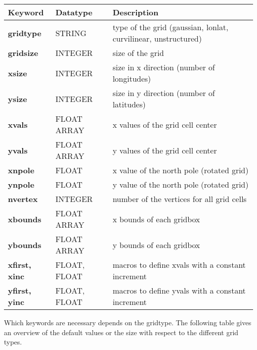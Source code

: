 \vspace{3mm}
\begin{tabular}[b]{lll}
Keyword           & Datatype     & Description \\ \hline
\bf{gridtype}     & STRING       & type of the grid (gaussian, lonlat, curvilinear, unstructured) \\
\bf{gridsize}     & INTEGER      & size of the grid \\
\bf{xsize}        & INTEGER      & size in x direction (number of longitudes) \\
\bf{ysize}        & INTEGER      & size in y direction (number of latitudes) \\
\bf{xvals}        & FLOAT ARRAY  & x values of the grid cell center \\
\bf{yvals}        & FLOAT ARRAY  & y values of the grid cell center\\
\bf{xnpole}       & FLOAT        & x value of the north pole (rotated grid) \\
\bf{ynpole}       & FLOAT        & y value of the north pole (rotated grid) \\
\bf{nvertex}      & INTEGER      & number of the vertices for all grid cells \\
\bf{xbounds}      & FLOAT ARRAY  & x bounds of each gridbox \\
\bf{ybounds}      & FLOAT ARRAY  & y bounds of each gridbox \\
\bf{xfirst, xinc} & FLOAT, FLOAT & macros to define xvals with a constant increment \\
\bf{yfirst, yinc} & FLOAT, FLOAT & macros to define yvals with a constant increment \\
\end{tabular}

\vspace{4mm}

Which keywords are necessary depends on the gridtype.
The following table gives an overview of the default values or the size
with respect to the different grid types.

